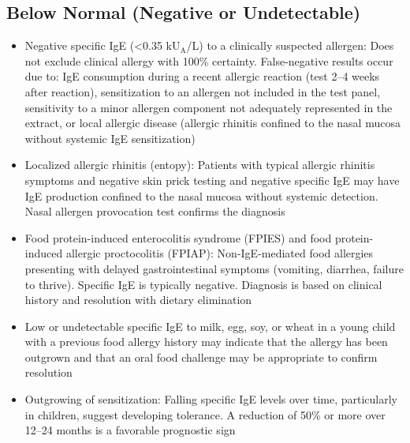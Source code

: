 \subsection*{Below Normal (Negative or Undetectable)}
\begin{itemize}
  \item Negative specific IgE (<0.35 kU$_\text{A}$/L) to a clinically suspected allergen: Does not exclude clinical allergy with 100\% certainty. False-negative results occur due to: IgE consumption during a recent allergic reaction (test 2--4 weeks after reaction), sensitization to an allergen not included in the test panel, sensitivity to a minor allergen component not adequately represented in the extract, or local allergic disease (allergic rhinitis confined to the nasal mucosa without systemic IgE sensitization)
  \item Localized allergic rhinitis (entopy): Patients with typical allergic rhinitis symptoms and negative skin prick testing and negative specific IgE may have IgE production confined to the nasal mucosa without systemic detection. Nasal allergen provocation test confirms the diagnosis
  \item Food protein-induced enterocolitis syndrome (FPIES) and food protein-induced allergic proctocolitis (FPIAP): Non-IgE-mediated food allergies presenting with delayed gastrointestinal symptoms (vomiting, diarrhea, failure to thrive). Specific IgE is typically negative. Diagnosis is based on clinical history and resolution with dietary elimination
  \item Low or undetectable specific IgE to milk, egg, soy, or wheat in a young child with a previous food allergy history may indicate that the allergy has been outgrown and that an oral food challenge may be appropriate to confirm resolution
  \item Outgrowing of sensitization: Falling specific IgE levels over time, particularly in children, suggest developing tolerance. A reduction of 50\% or more over 12--24 months is a favorable prognostic sign
\end{itemize}

